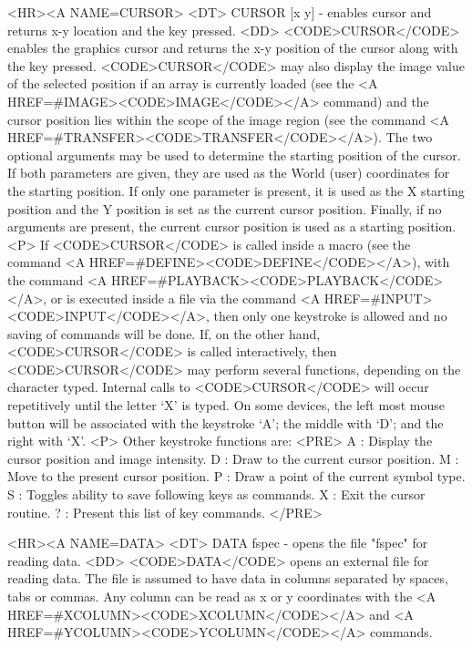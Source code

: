\begin{rawhtml}
<HR><A NAME=CURSOR>
<DT>
CURSOR [x y] - enables cursor and returns x-y location and the key pressed.
<DD>
	<CODE>CURSOR</CODE> enables the graphics cursor and returns the
	x-y position of the cursor along with the key pressed.
	<CODE>CURSOR</CODE> may also display the image value of the
	selected position if an array is currently loaded (see the
	<A HREF=#IMAGE><CODE>IMAGE</CODE></A> command) and the cursor
	position lies within the scope of the image region (see the
	command <A HREF=#TRANSFER><CODE>TRANSFER</CODE></A>).  The two
	optional arguments may be used to determine the starting
	position of the cursor.  If both parameters are given, they are
	used as the World (user) coordinates for the starting
	position.  If only one parameter is present, it is used as the
	X starting position and the Y position is set as the current
	cursor position.  Finally, if no arguments are present, the
	current cursor position is used as a starting position.
	<P>
	If <CODE>CURSOR</CODE> is called inside a macro (see the command
	<A HREF=#DEFINE><CODE>DEFINE</CODE></A>), with the command
	<A HREF=#PLAYBACK><CODE>PLAYBACK</CODE></A>, or is executed inside
	a file via the command <A HREF=#INPUT><CODE>INPUT</CODE></A>, then
	only one keystroke is allowed and no saving of commands will be
	done.  If, on the other hand, <CODE>CURSOR</CODE> is called
	interactively, then <CODE>CURSOR</CODE> may perform several
	functions, depending on the character typed.  Internal calls to
	<CODE>CURSOR</CODE> will occur repetitively until the letter `X'
	is typed.  On some devices, the left most mouse button will be
	associated with the keystroke `A'; the middle with `D'; and the
	right with `X'.
	<P>
	Other keystroke functions are:
	<PRE>
    A : Display the cursor position and image intensity.
    D : Draw to the current cursor position.
    M : Move to the present cursor position.
    P : Draw a point of the current symbol type.
    S : Toggles ability to save following keys as commands.
    X : Exit the cursor routine.
    ? : Present this list of key commands.
	</PRE>

<HR><A NAME=DATA>
<DT>
DATA fspec - opens the file "fspec" for reading data.
<DD>
	<CODE>DATA</CODE> opens an external file for reading data.  The
	file is assumed to have data in columns separated by spaces,
	tabs or commas.  Any column can be read as x or y coordinates
	with the <A HREF=#XCOLUMN><CODE>XCOLUMN</CODE></A> and
	<A HREF=#YCOLUMN><CODE>YCOLUMN</CODE></A> commands.


\end{rawhtml}

